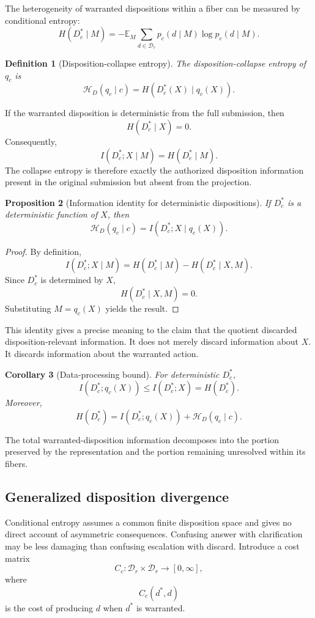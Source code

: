 \documentclass[11pt]{article}
\newtheorem{definition}{Definition}[section]
\newtheorem{proposition}[definition]{Proposition}
\newtheorem{corollary}[definition]{Corollary}
\theoremstyle{definition}
\newcommand{\E}{\mathbb{E}}
\begin{document}
The heterogeneity of warranted dispositions within a fiber can be measured by conditional entropy:
\[
H(D_c^{*}\mid M)
=
-\E_M
\sum_{d\in\mathcal D_r}
p_c(d\mid M)
\log p_c(d\mid M).
\]

\begin{definition}[Disposition-collapse entropy]
The disposition-collapse entropy of \(q_c\) is
\[
\mathscr H_D(q_c\mid c)
=
H(D_c^{*}(X)\mid q_c(X)).
\]
\end{definition}

If the warranted disposition is deterministic from the full submission, then
\[
H(D_c^{*}\mid X)=0.
\]
Consequently,
\[
I(D_c^{*};X\mid M)
=
H(D_c^{*}\mid M).
\]
The collapse entropy is therefore exactly the authorized disposition information present in the original submission but absent from the projection.

\begin{proposition}[Information identity for deterministic dispositions]
If \(D_c^{*}\) is a deterministic function of \(X\), then
\[
\mathscr H_D(q_c\mid c)
=
I(D_c^{*};X\mid q_c(X)).
\]
\end{proposition}

\begin{proof}
By definition,
\[
I(D_c^{*};X\mid M)
=
H(D_c^{*}\mid M)
-
H(D_c^{*}\mid X,M).
\]
Since \(D_c^{*}\) is determined by \(X\),
\[
H(D_c^{*}\mid X,M)=0.
\]
Substituting \(M=q_c(X)\) yields the result.
\end{proof}

This identity gives a precise meaning to the claim that the quotient discarded disposition-relevant information. It does not merely discard information about \(X\). It discards information about the warranted action.

\begin{corollary}[Data-processing bound]
For deterministic \(D_c^{*}\),
\[
I(D_c^{*};q_c(X))
\leq
I(D_c^{*};X)
=
H(D_c^{*}).
\]
Moreover,
\[
H(D_c^{*})
=
I(D_c^{*};q_c(X))
+
\mathscr H_D(q_c\mid c).
\]
\end{corollary}

The total warranted-disposition information decomposes into the portion preserved by the representation and the portion remaining unresolved within its fibers.

\subsection{Generalized disposition divergence}

Conditional entropy assumes a common finite disposition space and gives no direct account of asymmetric consequences. Confusing answer with clarification may be less damaging than confusing escalation with discard. Introduce a cost matrix
\[
C_c:\mathcal D_r\times\mathcal D_r\to[0,\infty],
\]
where
\[
C_c(d^{*},d)
\]
is the cost of producing \(d\) when \(d^{*}\) is warranted.
\end{document}
